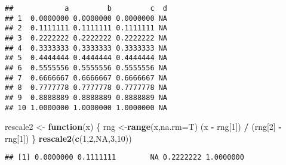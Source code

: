 \documentclass[]{article}
\newenvironment{Shaded}{\begin{snugshade}}{\end{snugshade}}
\newcommand{\KeywordTok}[1]{\textcolor[rgb]{0.13,0.29,0.53}{\textbf{#1}}}
\newcommand{\DataTypeTok}[1]{\textcolor[rgb]{0.13,0.29,0.53}{#1}}
\newcommand{\DecValTok}[1]{\textcolor[rgb]{0.00,0.00,0.81}{#1}}
\newcommand{\StringTok}[1]{\textcolor[rgb]{0.31,0.60,0.02}{#1}}
\newcommand{\OtherTok}[1]{\textcolor[rgb]{0.56,0.35,0.01}{#1}}
\newcommand{\ControlFlowTok}[1]{\textcolor[rgb]{0.13,0.29,0.53}{\textbf{#1}}}
\newcommand{\OperatorTok}[1]{\textcolor[rgb]{0.81,0.36,0.00}{\textbf{#1}}}
\newcommand{\NormalTok}[1]{#1}
\begin{document}
\begin{Shaded}
\end{Shaded}

\begin{verbatim}
##            a         b         c  d
## 1  0.0000000 0.0000000 0.0000000 NA
## 2  0.1111111 0.1111111 0.1111111 NA
## 3  0.2222222 0.2222222 0.2222222 NA
## 4  0.3333333 0.3333333 0.3333333 NA
## 5  0.4444444 0.4444444 0.4444444 NA
## 6  0.5555556 0.5555556 0.5555556 NA
## 7  0.6666667 0.6666667 0.6666667 NA
## 8  0.7777778 0.7777778 0.7777778 NA
## 9  0.8888889 0.8888889 0.8888889 NA
## 10 1.0000000 1.0000000 1.0000000 NA
\end{verbatim}

\begin{Shaded}
\begin{Highlighting}[]
\NormalTok{rescale2 <-}\StringTok{ }\ControlFlowTok{function}\NormalTok{(x) \{}
\NormalTok{ rng <-}\KeywordTok{range}\NormalTok{(x,}\DataTypeTok{na.rm=}\NormalTok{T)}
\NormalTok{ (x }\OperatorTok{-}\StringTok{ }\NormalTok{rng[}\DecValTok{1}\NormalTok{]) }\OperatorTok{/}\StringTok{ }\NormalTok{(rng[}\DecValTok{2}\NormalTok{] }\OperatorTok{-}\StringTok{ }\NormalTok{rng[}\DecValTok{1}\NormalTok{])}
\NormalTok{\}}
\KeywordTok{rescale2}\NormalTok{(}\KeywordTok{c}\NormalTok{(}\DecValTok{1}\NormalTok{,}\DecValTok{2}\NormalTok{,}\OtherTok{NA}\NormalTok{,}\DecValTok{3}\NormalTok{,}\DecValTok{10}\NormalTok{))}
\end{Highlighting}
\end{Shaded}

\begin{verbatim}
## [1] 0.0000000 0.1111111        NA 0.2222222 1.0000000
\end{verbatim}
\end{document}
